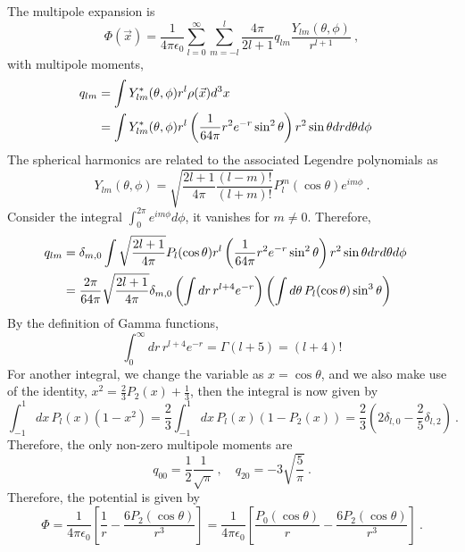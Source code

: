 \documentclass[12pt]{article}
\begin{document}
\newpage
{} The multipole expansion is
\begin{equation}
    \Phi(\vec x) = \frac{1}{4\pi \epsilon_0} \sum_{l = 0}^\infty \sum_{m = -l}^l \frac{4\pi}{2l+1} q_{lm} \frac{Y_{lm}(\theta, \phi)}{r^{l+1}}~,
\end{equation}
with multipole moments,
\begin{align}
    q_{lm} &= \int Y^*_{lm}(\theta, \phi) r^l \rho(\vec x) d^3 x\cr
    &=\int Y_{lm}^*(\theta, \phi) r^l \left(\frac{1}{64\pi} r^2 e^{-r} \sin^2 \theta\right) r^2 \sin\theta dr d\theta d\phi
\end{align}
The spherical harmonics are related to the associated Legendre polynomials as
\begin{equation}
    Y_{lm}(\theta, \phi) = \sqrt{\frac{2l+1}{4\pi} \frac{(l-m)!}{(l+m)!}} P_l^m(\cos \theta) e^{im\phi}~.
\end{equation}
Consider the integral $\int_0^{2\pi} e^{im\phi} d\phi$, it vanishes for $m \neq 0$. Therefore,
\begin{align}
    q_{lm} &= \delta_{m,0} \int \sqrt{\frac{2l+1}{4\pi}} P_l(\cos\theta)r^l \left(\frac{1}{64\pi} r^2 e^{-r} \sin^2 \theta\right) r^2 \sin\theta dr d\theta d\phi \cr
    &= \frac{2\pi}{64\pi}\sqrt{\frac{2l+1}{4\pi}} \delta_{m,0} \left(\int dr\, r^{l+4} e^{-r} \right) \left(\int d\theta\, P_l(\cos \theta) \sin^3\theta\right)
\end{align}
By the definition of Gamma functions,
\begin{equation}
    \boxed{
    \int_0^\infty dr\, r^{l+4} e^{-r} = \Gamma(l+5) = (l+4)!
    }
\end{equation}
For another integral, we change the variable as $x = \cos \theta$, and we also make use of the identity, $x^2 = \frac{2}{3} P_2(x) + \frac{1}{3}$, then the integral is now given by
\begin{equation}\label{eqn:a-integral}
    \boxed{
    \int_{-1}^1 dx\, P_l(x)(1-x^2) = \frac{2}{3}\int_{-1}^1 dx\, P_l(x) (1 - P_2(x)) = \frac{2}{3} \left(2 \delta_{l,0} - \frac{2}{5} \delta_{l,2}\right)~.
    }
\end{equation}
Therefore, the only non-zero multipole moments are
\begin{equation}
    \boxed{
    q_{00} = \frac{1}{2} \frac{1}{\sqrt{\pi}}~, \quad  q_{20} = -3\sqrt{\frac{5}{\pi}}~.
    }
\end{equation}
Therefore, the potential is given by
\begin{equation}
    \boxed{
    \Phi = \frac{1}{4\pi \epsilon_0} \left[\frac{1}{r} - \frac{6 P_2(\cos \theta)}{r^3}\right] = \frac{1}{4\pi \epsilon_0} \left[\frac{P_0(\cos\theta)}{r} - \frac{6 P_2(\cos \theta)}{r^3}\right]~.
    }
\end{equation}
\end{document}
